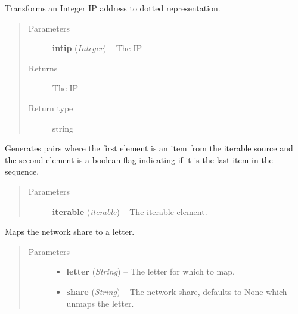 \documentclass[letterpaper,10pt,english]{sphinxmanual}
\begin{document}

\begin{fulllineitems}
\label{utils:utils.IntToDottedIP}
Transforms an Integer IP address to dotted representation.
\begin{quote}\begin{description}
\item[{Parameters}] \leavevmode
\textbf{intip} (\emph{Integer}) -- The IP

\item[{Returns}] \leavevmode
The IP

\item[{Return type}] \leavevmode
string

\end{description}\end{quote}

\end{fulllineitems}


\begin{fulllineitems}
\label{utils:utils.IterIsLast}
Generates pairs where the first element is an item from the iterable
source and the second element is a boolean flag indicating if it is the
last item in the sequence.
\begin{quote}\begin{description}
\item[{Parameters}] \leavevmode
\textbf{iterable} (\emph{iterable}) -- The iterable element.

\end{description}\end{quote}

\end{fulllineitems}


\begin{fulllineitems}
\label{utils:utils.MapNetworkShare}
Maps the network share to a letter.
\begin{quote}\begin{description}
\item[{Parameters}] \leavevmode\begin{itemize}
\item {} 
\textbf{letter} (\emph{String}) -- The letter for which to map.

\item {} 
\textbf{share} (\emph{String}) -- The network share, defaults to None which unmaps the letter.

\end{itemize}

\end{description}\end{quote}

\end{fulllineitems}
\end{document}

